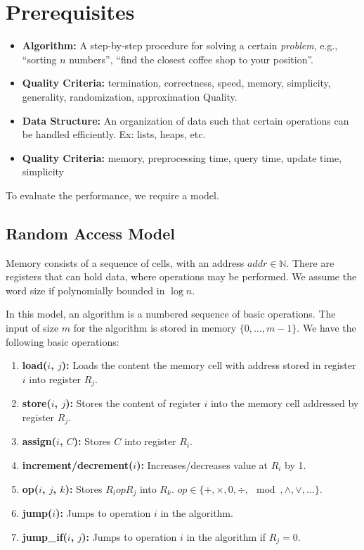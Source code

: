 \newpage

\section{Prerequisites}

\begin{itemize}

\item \textbf{Algorithm:} A step-by-step procedure for solving a certain \emph{problem}, e.g., ``sorting $n$ numbers'', ``find the closest coffee shop to your position''.

\item \textbf{Quality Criteria:} termination,  correctness, speed, memory, simplicity, generality, randomization, approximation Quality.

\item \textbf{Data Structure:} An organization of data such that certain operations can be handled efficiently. Ex: lists, heaps, etc.

\item \textbf{Quality Criteria:} memory, preprocessing time, query time, update time, simplicity

\end{itemize}

To evaluate the performance, we require a model.


\subsection{Random Access Model}

Memory consists of a sequence of cells, with an address ${addr} \in \mathbb{N}$. There are registers that can hold data, where operations may be performed. We assume the word size if polynomially bounded in $\log n$.

In this model, an algorithm is a numbered sequence of basic operations. The input of size $m$ for the algorithm is stored in memory $\{0, \ldots, m-1\}$. We have the following basic operations:

\begin{enumerate}
\item \textbf{load($i$, $j$):} Loads the content the memory cell with address stored in register $i$ into register $R_j$.
\item \textbf{store($i$, $j$):} Stores the content of register $i$ into the memory cell addressed by register $R_j$.
\item \textbf{assign($i$, $C$):} Stores $C$ into register $R_i$.
\item \textbf{increment/decrement($i$):} Increases/decreases value at $R_i$ by 1.
\item \textbf{op($i$, $j$, $k$):} Stores $R_i {op} R_j$ into $R_k$. ${op} \in \{+, \times, 0, \div, \mod, \wedge, \vee, \ldots\}$.
\item \textbf{jump($i$):} Jumps to operation $i$ in the algorithm.
\item \textbf{jump\_if($i$, $j$):} Jumps to operation $i$ in the algorithm if $R_j = 0$.
\end{enumerate}

